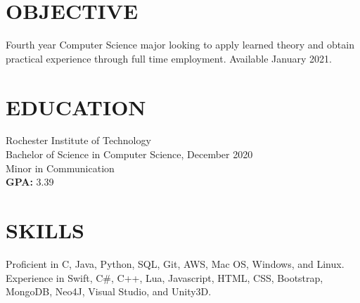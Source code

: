 \documentclass[line, resmargin]{res}
\begin{document}
%
%
\address{(484) 554-8487\\ emp9173@rit.edu}

\begin{resume}
\vspace{-7.5mm} %

\section{OBJECTIVE}
Fourth year Computer Science major looking to apply learned theory and obtain practical experience through full time employment.  Available January 2021.

\section{EDUCATION} 
 Rochester Institute of Technology \\
 Bachelor of Science in Computer Science, December 2020\\
 Minor in Communication\\
 \textbf{GPA:} 3.39
 
\section{SKILLS}
Proficient in C, Java, Python, SQL, Git, AWS, Mac OS, Windows, and Linux. \\
Experience in Swift, C\#, C++, Lua, Javascript, HTML, CSS, Bootstrap, MongoDB, Neo4J, Visual Studio, and Unity3D.
 
 

\end{resume}
\end{document}

